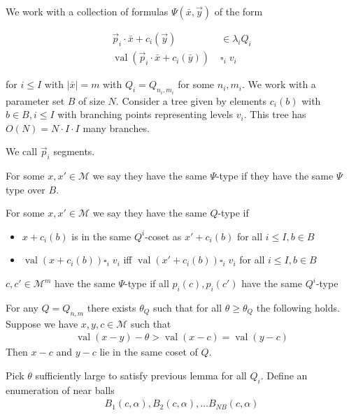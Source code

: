 \documentclass{amsart}
\newcommand{\M}{\mathcal M}
\DeclareMathOperator{\val}{val}
\begin{document}
We work with a collection of formulas $\Psi(\bar x, \vec y)$ of the form

\begin{align*}
	\vec p_i \cdot \bar x + c_i(\vec y) &\in \lambda_i Q_i \\
	\val(\vec p_i \cdot \bar x + c_i(\bar y)) \; &\square_i \; v_i
\end{align*}

for $i \leq I$ with $|\bar x| = m$ with $Q_i = Q_{n_i, m_i}$ for some $n_i, m_i$.
We work with a parameter set $B$ of size $N$.
Consider a tree given by elements $c_i(b)$ with $b \in B, i \leq I$ with branching points representing levels $v_i$.
This tree has $O(N) = N \cdot I \cdot I$ many branches.

We call $\vec p_i$ segments.

For some $x, x' \in \M$ we say they have the same $\Psi$-type if they have the same $\Psi$ type over $B$.

For some $x, x' \in \M$ we say they have the same $Q$-type if
\begin{itemize}
	\item $x + c_i(b)$ is in the same $Q^i$-coset as $x' + c_i(b)$ for all $i \leq I, b \in B$
	\item $\val(x + c_i(b)) \square_i \; v_i$ iff $\val(x' + c_i(b)) \square_i \; v_i$ for all $i \leq I, b \in B$
\end{itemize}
 
\begin{Lemma}
	$c, c' \in \M^m$ have the same $\Psi$-type if all $p_i(c), p_i(c')$ have the same $Q^i$-type
\end{Lemma}

\begin{Lemma}
	For any $Q = Q_{n,m}$ there exists $\theta_Q$ such that for all $\theta \geq \theta_Q$ the following holds.
	Suppose we have $x,y,c \in \M$ such that
	\begin{align*}
		\val(x-y) - \theta > \val(x-c) = \val(y-c)
	\end{align*}
	Then $x-c$ and $y-c$ lie in the same coset of $Q$.
\end{Lemma}

\begin{Lemma}
	Pick $\theta$ sufficiently large to satisfy previous lemma for all $Q_i$. Define an enumeration of near balls
	\begin{align*}
		B_1(c, \alpha), B_2(c, \alpha), \ldots B_{NB}(c, \alpha)
	\end{align*}
\end{Lemma}
\end{document}
